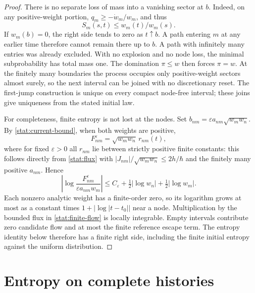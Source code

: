 \documentclass[11pt,oneside,openany]{book}
\theoremstyle{definition}
\theoremstyle{remark}\newtheorem{remark}[theorem]{Remark}
\begin{document}
\begin{proof}
There is no separate loss of mass into a vanishing sector at $b$. Indeed,
on any positive-weight portion,
$q_m\geq-\dot w_m/w_m$, and thus
\begin{equation}\label{stat:node-survival}
 S_m(s,t)\leq w_m(t)/w_m(s).
\end{equation}
If $w_m(b)=0$, the right side tends to zero as $t\uparrow b$. A path entering
$m$ at any earlier time therefore cannot remain there up to $b$. A path
with infinitely many entries was already excluded. With no explosion and
no node loss, the minimal subprobability has total mass one. The domination
$\pi\leq w$ then forces $\pi=w$. At the finitely many boundaries the process
occupies only positive-weight sectors almost surely, so the next interval
can be joined with no discretionary reset. The first-jump construction is
unique on every compact node-free interval; these joins give uniqueness
from the stated initial law.

For completeness, finite entropy is not lost at the nodes. Set
$b_{nm}=\varepsilon a_{nm}\sqrt{w_mw_n}$. By
\eqref{stat:current-bound}, when both weights are positive,
\[
 F^\varepsilon_{nm}=\sqrt{w_mw_n}\,r_{nm}(t),
\]
where for fixed $\varepsilon>0$ all $r_{nm}$ lie between strictly positive
finite constants: this follows directly from \eqref{stat:flux} with
$|J_{nm}|/\sqrt{w_mw_n}\leq2h/\hbar$ and the finitely many positive
$a_{nm}$. Hence
\[
 \left|\log\frac{F^\varepsilon_{nm}}{\varepsilon a_{nm}w_m}\right|
 \leq C_\varepsilon+\tfrac12|\log w_n|+\tfrac12|\log w_m|.
\]
Each nonzero analytic weight has a finite-order zero, so its logarithm grows
at most as a constant times $1+|\log|t-t_0||$ near a node. Multiplication by
the bounded flux in \eqref{stat:finite-flow} is locally integrable. Empty
intervals contribute zero candidate flow and at most the finite reference
escape term. The entropy identity below therefore has a finite right side,
including the finite initial entropy against the uniform distribution.
\end{proof}

\section{Entropy on complete histories}
\end{document}
